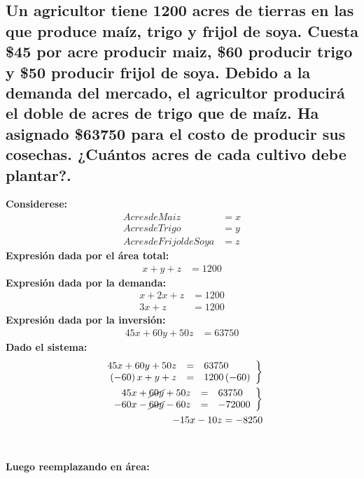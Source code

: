 \documentclass[11pt, a4paper]{article}
\begin{document}
\subsection{Un agricultor tiene 1200 acres de tierras en las que produce maíz, trigo y frijol de soya. Cuesta \$45 por acre producir maiz, \$60 producir trigo y \$50 producir frijol de soya. Debido a la demanda del mercado, el agricultor producirá el doble de acres de trigo que de maíz. Ha asignado \$63750 para el costo de producir sus cosechas. ¿Cuántos acres de cada cultivo debe plantar?.}
\begin{multicols}{2}
  \textbf{Considerese:}
  \begin{align*}
  Acres de Maiz &= x\\
  Acres de Trigo &= y\\
  Acres de Frijol de Soya &= z
  \end{align*}
  \textbf{Expresión dada por el área total:}
  \begin{align*}
    x + y + z &= 1200
  \end{align*}
  \textbf{Expresión dada por la demanda:}
  \begin{align*}
    x + 2x + z &= 1200\\
    3x + z &= 1200
  \end{align*}
  \textbf{Expresión dada por la inversión:}
  \begin{align*}
    45x + 60y + 50z &= 63750
  \end{align*}  
  \textbf{Dado el sistema:}
  \begin{align*}
    \left.
      \begin{array}{rcl}
        45x + 60y + 50z &= &63750\\
        \left(-60\right)x + y + z &= &1200\left(-60\right)
      \end{array}
    \right\}\\
    \left.
      \begin{array}{rcl}
        45x + \cancel{60y} + 50z &= &63750\\
        -60x - \cancel{60y} - 60z &= &-72000
      \end{array}
    \right\}\\
    -15x - 10z = -8250
  \end{align*}\\
  \columnseprule=1pt
  \columnbreak
  \\
  \textbf{Luego reemplazando en área:}
  \begin{align*}
    \left.
      \begin{array}{rcl}

\end{array}
\end{align*}
\end{multicols}
\end{document}

